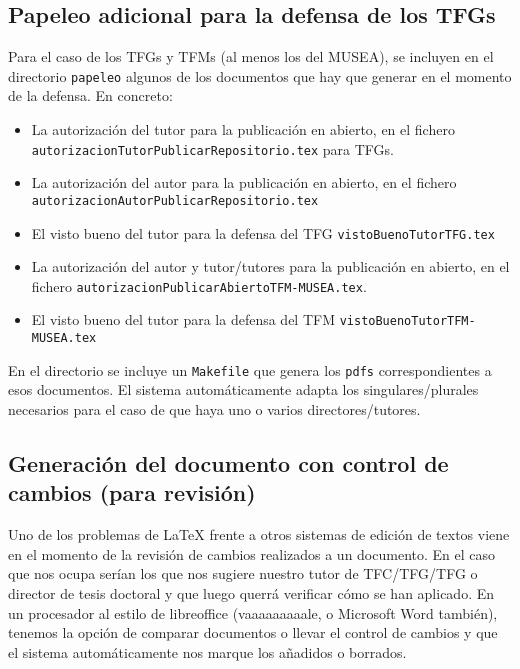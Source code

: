 \subsection{Papeleo adicional para la defensa de los TFGs}
\label{sec:introapp1}

Para el caso de los TFGs y TFMs (al menos los del MUSEA), se incluyen en
el directorio \texttt{papeleo} algunos de los documentos que hay que
generar en el momento de la defensa. En concreto:

\begin{itemize}
\item La autorización del tutor para la publicación en abierto, en el
  fichero \texttt{autorizacionTutorPublicarRepositorio.tex} para TFGs.
\item La autorización del autor para la publicación en abierto, en el
  fichero \texttt{autorizacionAutorPublicarRepositorio.tex}
\item El visto bueno del tutor para la defensa del TFG
  \texttt{vistoBuenoTutorTFG.tex}
\item La autorización del autor y tutor/tutores para la publicación en
  abierto, en el fichero
  \texttt{autorizacionPublicarAbiertoTFM-MUSEA.tex}.
\item El visto bueno del tutor para la defensa del TFM
  \texttt{vistoBuenoTutorTFM-MUSEA.tex}
\end{itemize}

En el directorio se incluye un \texttt{Makefile} que genera los
\texttt{pdfs} correspondientes a esos documentos. El sistema
automáticamente adapta los singulares/plurales necesarios para el caso
de que haya uno o varios directores/tutores.
 

\subsection{Generación del documento con control de cambios (para revisión)}
\label{sec:control-de-cambios}

Uno de los problemas de \LaTeX{} frente a otros sistemas de edición de
textos viene en el momento de la revisión de cambios realizados a un
documento. En el caso que nos ocupa serían los que nos sugiere nuestro
tutor de TFC/TFG/TFG o director de tesis doctoral y que luego querrá
verificar cómo se han aplicado. En un procesador al estilo de
libreoffice (vaaaaaaaaale, o Microsoft Word también), tenemos la opción
de comparar documentos o llevar el control de cambios y que el sistema
automáticamente nos marque los añadidos o borrados. 

